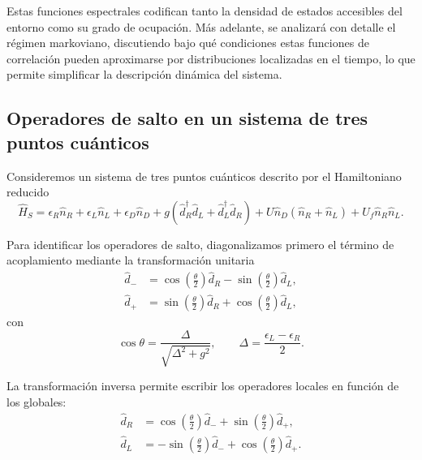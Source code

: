 \begin{appendixs}
Estas funciones espectrales codifican tanto la densidad de estados accesibles del entorno como su grado de ocupación.  
Más adelante, se analizará con detalle el régimen markoviano, discutiendo bajo qué condiciones estas funciones de correlación pueden aproximarse por distribuciones localizadas en el tiempo, lo que permite simplificar la descripción dinámica del sistema.

\label{apendix5bathcorre}


\subsection{Operadores de salto en un sistema de tres puntos cuánticos}
\label{apendix5jumpop}

Consideremos un sistema de tres puntos cuánticos descrito por el Hamiltoniano reducido
\begin{equation*}
    \hat{H}_{S} = \epsilon_{R}\hat{n}_{R} + \epsilon_{L}\hat{n}_{L} + \epsilon_{D}\hat{n}_{D}
    + g(\hat{d}^{\dagger}_{R}\hat{d}_{L} + \hat{d}^{\dagger}_{L}\hat{d}_{R})
    + U \hat{n}_{D}(\hat{n}_{R} + \hat{n}_{L}) + U_{f}\hat{n}_{R}\hat{n}_{L}.
\end{equation*}

Para identificar los operadores de salto, diagonalizamos primero el término de acoplamiento mediante la transformación unitaria
\begin{align*}
    \hat{d}_{-} & = \cos(\tfrac{\theta}{2})\hat{d}_{R} - \sin(\tfrac{\theta}{2})\hat{d}_{L}, \\
    \hat{d}_{+} & = \sin(\tfrac{\theta}{2})\hat{d}_{R} + \cos(\tfrac{\theta}{2})\hat{d}_{L},
\end{align*}
con
\begin{equation*}
    \cos \theta = \frac{\Delta}{\sqrt{ \Delta^{2} + g^{2} }}, 
    \qquad 
    \Delta = \frac{\epsilon_{L}-\epsilon_{R}}{2}.
\end{equation*}

La transformación inversa permite escribir los operadores locales en función de los globales:
\begin{align*}
    \hat{d}_{R} & = \cos(\tfrac{\theta}{2})\hat{d}_{-} + \sin(\tfrac{\theta}{2})\hat{d}_{+}, \\
    \hat{d}_{L} & = -\sin(\tfrac{\theta}{2})\hat{d}_{-} + \cos(\tfrac{\theta}{2})\hat{d}_{+}.
\end{align*}


\end{appendixs}
